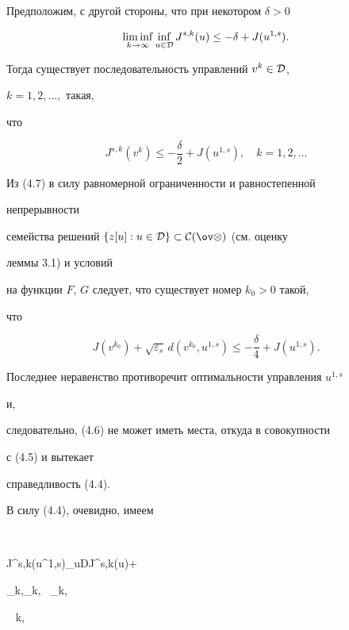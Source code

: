 Предположим, с другой стороны, что при некотором $\delta>0$ 


\begin{equation} 


\liminf_{k\to\infty}\inf_{u\in\cal D} 


J^{s,k}(u)\le-\delta+J(u^{1,s}). 


\end{equation} 


Тогда существует последовательность управлений $v^k\in\cal D$, 


$k=1,2,\dotsc,$ такая, 


что 


\begin{equation} 


J^{s,k}(v^k)\le-\frac{\delta}{2}+J(u^{1,s}),\quad 


k=1,2,\dotsc 


\end{equation} 


Из (4.7) в силу равномерной ограниченности и равностепенной 


непрерывности 


семейства решений $\{z[u]:u\in\cal D\}\subset C(\ov\Omega)$ (см. оценку 


леммы 3.1) и условий 


на функции $F$, $G$ следует, что существует номер $k_0>0$ такой, 


что 


$$ 


J(v^{k_0})+\sqrt{\varepsilon_s}\,d(v^{k_0},u^{1,s})\le 


-\frac{\delta}{4}+J(u^{1,s}). 


$$ 


Последнее неравенство противоречит оптимальности управления $u^{1,s}$ 


и, 


следовательно, (4.6) не может иметь места, откуда в совокупности 


с (4.5) и вытекает 


справедливость (4.4). 


 


В силу (4.4), очевидно, имеем 


$$ 


J^{s,k}(u^{1,s})\le\inf_{u\in\cal D}J^{s,k}(u)+ 


\delta_k,\quad \delta_k,\ \; \delta_k\to\infty, 


\ \; k\to\infty, 


